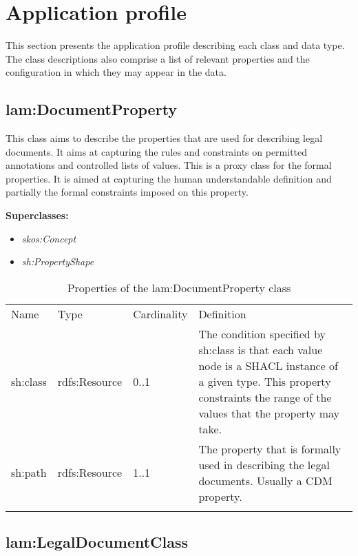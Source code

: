 \section{Application profile}\label{ariaid-title11}

This section presents the application profile describing each class and data type. 
The class descriptions also comprise a list of relevant properties and the configuration in which they may appear in the data.

\subsection{lam:DocumentProperty}

This class aims to describe the properties that are used for describing legal documents. It aims at capturing the rules and constraints on permitted annotations and controlled lists of values.
This is a proxy class for the formal properties. It is aimed at capturing the human understandable definition and partially the formal constraints imposed on this property.

\textbf{Superclasses:}

\begin{itemize}
\itemsep1pt\parskip0pt
\item
  \emph{skos:Concept}
\item
  \emph{sh:PropertyShape}
\end{itemize}

{
	\footnotesize
	\selectfont%
	\begin{longtable}[c]{@{}p{3cm}p{2cm}p{2cm}p{7.8cm}@{}}
		\toprule\addlinespace
		Name & Type & Cardinality & Definition
		\\\addlinespace
		\midrule\endhead
		sh:class & rdfs:Resource & 0..1 & The condition specified by sh:class is
		that each value node is a SHACL instance of a given type. This property
		constraints the range of the values that the property may take.
		\\\addlinespace
		sh:path & rdfs:Resource & 1..1 & The property that is formally used in
		describing the legal documents. Usually a CDM property.
		\\\addlinespace
		\bottomrule
		\addlinespace
		\caption{Properties of the lam:DocumentProperty class}
	\end{longtable}
}

\subsection{lam:LegalDocumentClass}

